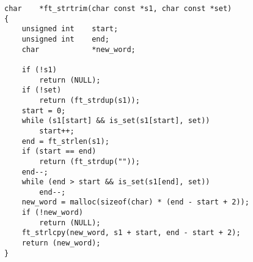 \documentclass{article}
\begin{document}
\begin{itemize}[label=$\rightarrow$]
\begin{verbatim}
char    *ft_strtrim(char const *s1, char const *set)                            
{                                                                               
    unsigned int    start;                                                      
    unsigned int    end;                                                        
    char            *new_word;                                                  
                                                                                
    if (!s1)                                                                    
        return (NULL);                                                          
    if (!set)                                                                   
        return (ft_strdup(s1));                                                 
    start = 0;                                                                  
    while (s1[start] && is_set(s1[start], set))                                 
        start++;                                                                
    end = ft_strlen(s1);                                                        
    if (start == end)                                                           
        return (ft_strdup(""));                                                 
    end--;                                                                      
    while (end > start && is_set(s1[end], set))                                 
        end--;                                                                  
    new_word = malloc(sizeof(char) * (end - start + 2));                        
    if (!new_word)                                                              
        return (NULL);                                                          
    ft_strlcpy(new_word, s1 + start, end - start + 2);                          
    return (new_word);                                                          
}   
			\end{verbatim}
		\end{itemize}
	
\end{document}
